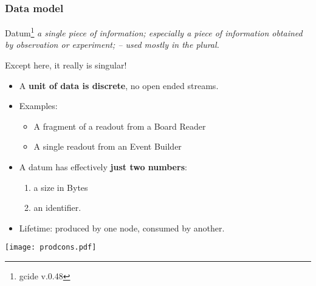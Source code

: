 \documentclass[xcolor=dvipsnames]{beamer}
\begin{document}
\begin{frame}
  \frametitle{Data model} 

  \footnotesize
  Datum\footnote{gcide v.0.48} \textit{a single piece of information; especially a
    piece of information obtained by observation or experiment; --
    used mostly in the plural.} 
  \normalsize

  Except here, it really is singular!

  \begin{itemize}
  \item A \textbf{unit of data is discrete}, no open ended streams.
  \item Examples:
    \begin{itemize}
    \item A fragment of a readout from a Board Reader
    \item A single readout from an Event Builder
    \end{itemize}
  \item A datum has effectively \textbf{just two numbers}:
    \begin{enumerate}
    \item a size in Bytes
    \item an identifier.
    \end{enumerate}
  \item Lifetime: produced by one node, consumed by another.
  \end{itemize}
  \vspace{-10mm}
  \begin{center}
    \texttt{[image: prodcons.pdf]}
  \end{center}
  \vspace{-10mm}
\end{frame}
\end{document}
